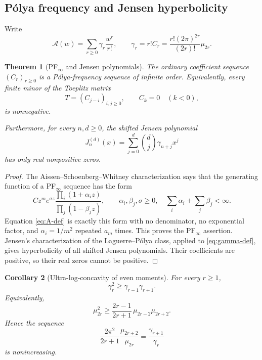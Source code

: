 \documentclass[11pt,oneside]{article}
\newtheorem{theorem}{Theorem}[section]
\newtheorem{corollary}[theorem]{Corollary}
\theoremstyle{definition}
\theoremstyle{remark}
\begin{document}
\subsection{P\'olya frequency and Jensen hyperbolicity}

Write
\begin{equation}\label{eq:gamma-def}
 \mathcal A(w)=\sum_{r\ge0}\gamma_r\frac{w^r}{r!},
 \qquad
 \gamma_r=r!C_r
 =\frac{r!(2\pi)^{2r}}{(2r)!}\mu_{2r}.
\end{equation}

\begin{theorem}[PF$_\infty$ and Jensen polynomials]\label{thm:PF-Jensen}
The ordinary coefficient sequence $(C_r)_{r\ge0}$ is a P\'olya-frequency
sequence of infinite order.  Equivalently, every finite minor of the Toeplitz
matrix
\begin{equation}\label{eq:Toeplitz}
 T=(C_{j-i})_{i,j\ge0},\qquad C_k=0\quad(k<0),
\end{equation}
is nonnegative.

Furthermore, for every $n,d\ge0$, the shifted Jensen polynomial
\begin{equation}\label{eq:Jensen}
 J_n^{(d)}(x)=\sum_{j=0}^{d}\binom dj\gamma_{n+j}x^j
\end{equation}
has only real nonpositive zeros.
\end{theorem}

\begin{proof}
The Aissen--Schoenberg--Whitney characterization says that the generating
function of a PF$_\infty$ sequence has the form
\[
 Cz^me^{\sigma z}\frac{\prod_i(1+\alpha_i z)}
 {\prod_j(1-\beta_jz)},
 \qquad \alpha_i,\beta_j,\sigma\ge0,
 \quad \sum_i\alpha_i+\sum_j\beta_j<\infty.
\]
Equation \cref{eq:A-def} is exactly this form with no denominator, no
exponential factor, and $\alpha_i=1/m^2$ repeated $a_m$ times.  This proves the
PF$_\infty$ assertion.  Jensen's characterization of the Laguerre--P\'olya
class, applied to \cref{eq:gamma-def}, gives hyperbolicity of all shifted
Jensen polynomials.  Their coefficients are positive, so their real zeros
cannot be positive.
\end{proof}

\begin{corollary}[Ultra-log-concavity of even moments]\label{cor:moment-turan}
For every $r\ge1$,
\begin{equation}\label{eq:gamma-turan}
 \gamma_r^2\ge\gamma_{r-1}\gamma_{r+1}.
\end{equation}
Equivalently,
\begin{equation}\label{eq:mu-turan}
 \boxed{
 \mu_{2r}^2\ge
 \frac{2r-1}{2r+1}\,\mu_{2r-2}\mu_{2r+2}.}
\end{equation}
Hence the sequence
\begin{equation}\label{eq:ratio-monotone}
 \frac{2\pi^2}{2r+1}\frac{\mu_{2r+2}}{\mu_{2r}}
 =\frac{\gamma_{r+1}}{\gamma_r}
\end{equation}
is nonincreasing.
\end{corollary}
\end{document}
